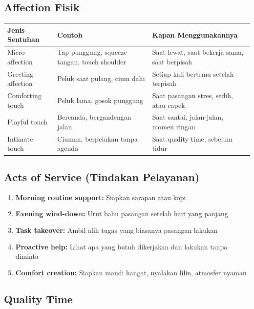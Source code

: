 \subsection{Affection Fisik}

\begin{center}
\renewcommand{\arraystretch}{1.4}
\begin{tabular}{|>{\raggedright}p{3cm}|>{\raggedright}p{4.5cm}|>{\raggedright\arraybackslash}p{6cm}|}
\hline
\rowcolor{sagegreen!20}
\textbf{Jenis Sentuhan} & \textbf{Contoh} & \textbf{Kapan Menggunakannya} \\
\hline
Micro-affection & Tap punggung, squeeze tangan, touch shoulder & Saat lewat, saat bekerja sama, saat berpisah \\
\hline
Greeting affection & Peluk saat pulang, cium dahi & Setiap kali bertemu setelah terpisah \\
\hline
Comforting touch & Peluk lama, gosok punggung & Saat pasangan stres, sedih, atau capek \\
\hline
Playful touch & Bercanda, bergandengan jalan & Saat santai, jalan-jalan, momen ringan \\
\hline
Intimate touch & Ciuman, berpelukan tanpa agenda & Saat quality time, sebelum tidur \\
\hline
\end{tabular}
\end{center}

\subsection{Acts of Service (Tindakan Pelayanan)}

\begin{enumerate}
    \item \textbf{Morning routine support:} Siapkan sarapan atau kopi
    \item \textbf{Evening wind-down:} Urut bahu pasangan setelah hari yang panjang
    \item \textbf{Task takeover:} Ambil alih tugas yang biasanya pasangan lakukan
    \item \textbf{Proactive help:} Lihat apa yang butuh dikerjakan dan lakukan tanpa diminta
    \item \textbf{Comfort creation:} Siapkan mandi hangat, nyalakan lilin, atmosfer nyaman
\end{enumerate}

\subsection{Quality Time}

